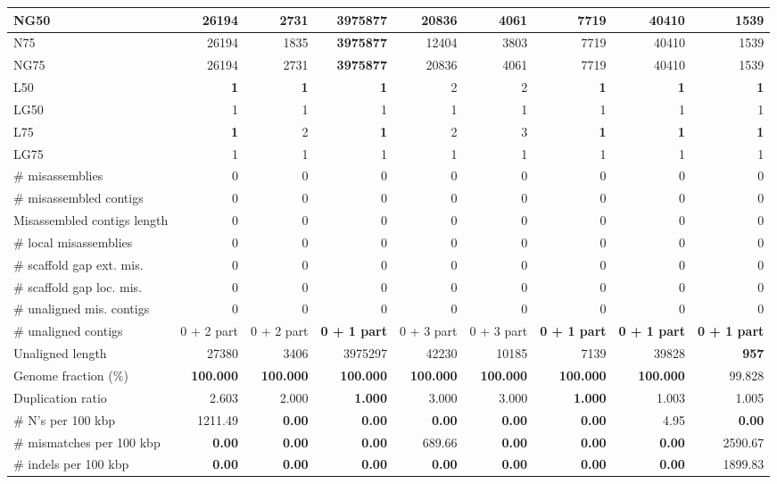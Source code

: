 \documentclass[12pt,a4paper]{article}
\begin{document}
\begin{table}[ht]
\begin{center}
\begin{tabular}{|l*{8}{|r}|}
NG50 & 26194 & 2731 & {\bf 3975877} & 20836 & 4061 & 7719 & 40410 & 1539 \\ \hline
N75 & 26194 & 1835 & {\bf 3975877} & 12404 & 3803 & 7719 & 40410 & 1539 \\ \hline
NG75 & 26194 & 2731 & {\bf 3975877} & 20836 & 4061 & 7719 & 40410 & 1539 \\ \hline
L50 & {\bf 1} & {\bf 1} & {\bf 1} & 2 & 2 & {\bf 1} & {\bf 1} & {\bf 1} \\ \hline
LG50 & 1 & 1 & 1 & 1 & 1 & 1 & 1 & 1 \\ \hline
L75 & {\bf 1} & 2 & {\bf 1} & 2 & 3 & {\bf 1} & {\bf 1} & {\bf 1} \\ \hline
LG75 & 1 & 1 & 1 & 1 & 1 & 1 & 1 & 1 \\ \hline
\# misassemblies & 0 & 0 & 0 & 0 & 0 & 0 & 0 & 0 \\ \hline
\# misassembled contigs & 0 & 0 & 0 & 0 & 0 & 0 & 0 & 0 \\ \hline
Misassembled contigs length & 0 & 0 & 0 & 0 & 0 & 0 & 0 & 0 \\ \hline
\# local misassemblies & 0 & 0 & 0 & 0 & 0 & 0 & 0 & 0 \\ \hline
\# scaffold gap ext. mis. & 0 & 0 & 0 & 0 & 0 & 0 & 0 & 0 \\ \hline
\# scaffold gap loc. mis. & 0 & 0 & 0 & 0 & 0 & 0 & 0 & 0 \\ \hline
\# unaligned mis. contigs & 0 & 0 & 0 & 0 & 0 & 0 & 0 & 0 \\ \hline
\# unaligned contigs & 0 + 2 part & 0 + 2 part & {\bf 0 + 1 part} & 0 + 3 part & 0 + 3 part & {\bf 0 + 1 part} & {\bf 0 + 1 part} & {\bf 0 + 1 part} \\ \hline
Unaligned length & 27380 & 3406 & 3975297 & 42230 & 10185 & 7139 & 39828 & {\bf 957} \\ \hline
Genome fraction (\%) & {\bf 100.000} & {\bf 100.000} & {\bf 100.000} & {\bf 100.000} & {\bf 100.000} & {\bf 100.000} & {\bf 100.000} & 99.828 \\ \hline
Duplication ratio & 2.603 & 2.000 & {\bf 1.000} & 3.000 & 3.000 & {\bf 1.000} & 1.003 & 1.005 \\ \hline
\# N's per 100 kbp & 1211.49 & {\bf 0.00} & {\bf 0.00} & {\bf 0.00} & {\bf 0.00} & {\bf 0.00} & 4.95 & {\bf 0.00} \\ \hline
\# mismatches per 100 kbp & {\bf 0.00} & {\bf 0.00} & {\bf 0.00} & 689.66 & {\bf 0.00} & {\bf 0.00} & {\bf 0.00} & 2590.67 \\ \hline
\# indels per 100 kbp & {\bf 0.00} & {\bf 0.00} & {\bf 0.00} & {\bf 0.00} & {\bf 0.00} & {\bf 0.00} & {\bf 0.00} & 1899.83 \\ \hline

\end{tabular}
\end{center}
\end{table}
\end{document}
